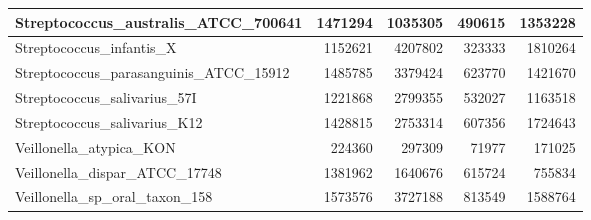 \documentclass[12pt,a4paper]{article}
\begin{document}
\begin{table}[ht]
\begin{center}
\begin{tabular}{|l*{4}{|r}|}
Streptococcus\_australis\_ATCC\_700641 & 1471294 & 1035305 & 490615 & 1353228 \\ \hline
Streptococcus\_infantis\_X & 1152621 & 4207802 & 323333 & 1810264 \\ \hline
Streptococcus\_parasanguinis\_ATCC\_15912 & 1485785 & 3379424 & 623770 & 1421670 \\ \hline
Streptococcus\_salivarius\_57I & 1221868 & 2799355 & 532027 & 1163518 \\ \hline
Streptococcus\_salivarius\_K12 & 1428815 & 2753314 & 607356 & 1724643 \\ \hline
Veillonella\_atypica\_KON & 224360 & 297309 & 71977 & 171025 \\ \hline
Veillonella\_dispar\_ATCC\_17748 & 1381962 & 1640676 & 615724 & 755834 \\ \hline
Veillonella\_sp\_oral\_taxon\_158 & 1573576 & 3727188 & 813549 & 1588764 \\ \hline
\end{tabular}
\end{center}
\end{table}
\end{document}
